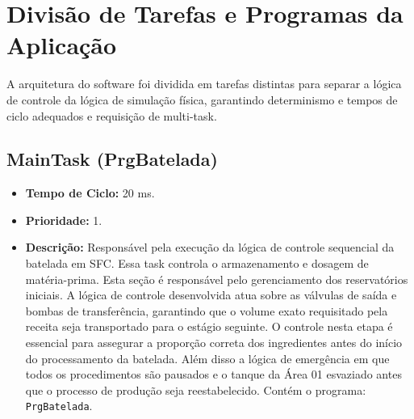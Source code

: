 \section{Divisão de Tarefas e Programas da Aplicação}\label{sec:div-tarefas}

A arquitetura do software foi dividida em tarefas distintas para separar a lógica de controle da lógica de simulação física, garantindo determinismo e tempos de ciclo adequados e requisição de multi-task.

\subsection{MainTask (PrgBatelada)}
\begin{itemize}
    \item \textbf{Tempo de Ciclo:} 20 ms.
    \item \textbf{Prioridade:} 1.
    \item \textbf{Descrição:} Responsável pela execução da lógica de controle sequencial da batelada em SFC. Essa task controla o armazenamento e dosagem de matéria-prima. Esta seção é responsável pelo gerenciamento dos reservatórios iniciais. A lógica de controle desenvolvida atua sobre as válvulas de saída e bombas de transferência, garantindo que o volume exato requisitado pela receita seja transportado para o estágio seguinte. O controle nesta etapa é essencial para assegurar a proporção correta dos ingredientes antes do início do processamento da batelada. Além disso a lógica de emergência em que todos os procedimentos são pausados e o tanque da Área 01 esvaziado antes que o processo de produção seja reestabelecido. Contém o programa: \texttt{PrgBatelada}.
\end{itemize}

